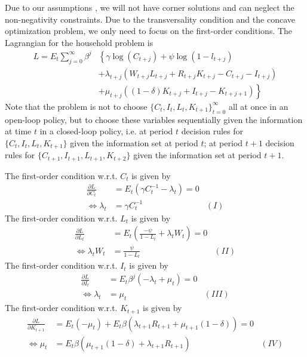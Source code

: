\begin{Solution}{2}
		Due to our assumptions , we will not have corner solutions and can neglect the non-negativity constraints. Due to the transversality condition and the concave optimization problem, we only need to focus on the first-order conditions.
		The Lagrangian for the household problem is
		\begin{align*}
		L = E_t\sum_{j=0}^{\infty}\beta^j&\left\{\gamma \log(C_{t+j}) + \psi \log(1-l_{t+j})\right.\\
		&+\lambda_{t+j}\left(W_{t+j} L_{t+j} + R_{t+j} K_{t+j} - C_{t+j} - I_{t+j}\right)\\
		&+ \left. \mu_{t+j} \left((1-\delta)K_{t+j} + I_{t+j} - K_{t+j+1}\right)\right\}
		\end{align*}
		Note that the problem is not to choose $\{C_t,I_t,L_t,K_{t+1}\}_{t=0}^\infty$ all at once in an open-loop policy, but to choose these variables sequentially given the information at time $t$ in a closed-loop policy, i.e. at period $t$ decision rules for $\{C_t,I_t,L_t,K_{t+1}\}$ given the information set at period $t$; at period $t+1$ decision rules for $\{C_{t+1},I_{t+1},L_{t+1},K_{t+2}\}$ given the information set at period $t+1$.

		The first-order condition w.r.t. $C_t$ is given by
		\begin{align*}
		\frac{\partial L}{\partial C_{t}} &= E_t \left(\gamma C_t^{-1}-\lambda_{t}\right) = 0\\
		\Leftrightarrow \lambda_{t} &= \gamma C_{t}^{-1} & (I)
		\end{align*}
		The first-order condition w.r.t. $L_t$ is given by
		\begin{align*}
		\frac{\partial L}{\partial L_{t}} &= E_t \left(\frac{-\psi}{1-L_{t}}+\lambda_{t} W_{t}\right) = 0\\
		\Leftrightarrow \lambda_{t} W_{t} &= \frac{\psi}{1-L_{t}} &(II)
		\end{align*}
		The first-order condition w.r.t. $I_{t}$ is given by
		\begin{align*}
		\frac{\partial L}{\partial I_{t}} &= E_t \beta^j \left(-\lambda_{t} + \mu_{t}\right) = 0\\
		\Leftrightarrow \lambda_{t} &= \mu_{t} & (III)
		\end{align*}
		The first-order condition w.r.t. $K_{t+1}$ is given by
		\begin{align*}
		\frac{\partial L}{\partial K_{t+1}} &= E_t (-\mu_{t}) +
		E_t \beta \left(\lambda_{t+1}R_{t+1}+\mu_{t+1}(1-\delta)\right) = 0\\
		\Leftrightarrow \mu_{t} &= E_t \beta(\mu_{t+1}(1-\delta)+\lambda_{t+1}R_{t+1}) & (IV)
		\end{align*}


\end{Solution}
